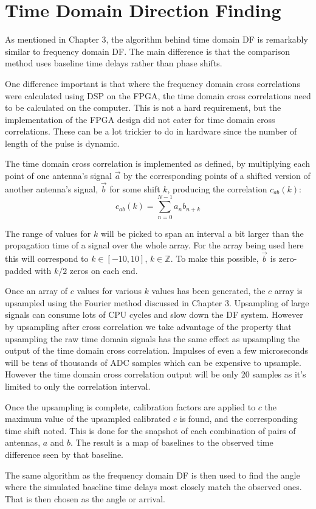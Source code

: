 \section{Time Domain Direction Finding}

As mentioned in Chapter 3, the algorithm behind time domain DF is remarkably similar to frequency domain DF. The main difference is that the comparison method uses baseline time delays rather than phase shifts. 

One difference important is that where the frequency domain cross correlations were calculated using DSP on the FPGA, the time domain cross correlations need to be calculated on the computer. This is not a hard requirement, but the implementation of the FPGA design did not cater for time domain cross correlations. These can be a lot trickier to do in hardware since the number of length of the pulse is dynamic.

The time domain cross correlation is implemented as defined, by multiplying each point of one antenna's signal \(\vec{a}\) by the corresponding points of a shifted version of another antenna's signal, \(\vec{b}\) for some shift \(k\), producing the correlation \(c_{ab}(k)\):
\begin{equation}
  c_{ab}(k) = \sum_{n = 0}^{N-1} a_{n} b_{n+k}
\end{equation}

The range of values for \(k\) will be picked to span an interval a bit larger than the propagation time of a signal over the whole array. For the array being used here this will correspond to \(k\in [-10, 10]\), \(k\in \mathbb{Z}\). To make this possible, \(\vec{b}\) is zero-padded with \(k/2\) zeros on each end.

Once an array of \(c\) values for various \(k\) values has been generated, the \(c\) array is upsampled using the Fourier method discussed in Chapter 3.  Upsampling of large signals can consume lots of CPU cycles and slow down the DF system. However by upsampling after cross correlation we take advantage of the property that upsampling the raw time domain signals has the same effect as upsampling the output of the time domain cross correlation. Impulses of even a few microseconds will be tens of thousands of ADC samples which can be expensive to upsample. However the time domain cross correlation output will be only 20 samples as it's limited to only the correlation interval. 

Once the upsampling is complete, calibration factors are applied to \(c\) the maximum value of the upsampled calibrated \(c\) is found, and the corresponding time shift noted. This is done for the snapshot of each combination of pairs of antennas, \(a\) and \(b\). The result is a map of baselines to the observed time difference seen by that baseline.

The same algorithm as the frequency domain DF is then used to find the angle where the simulated baseline time delays most closely match the observed ones. That is then chosen as the angle or arrival.



